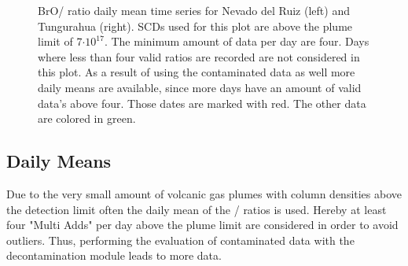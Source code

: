 \documentclass  [
  paper    = a4,
  BCOR     = 10mm,
  twoside,
  fontsize = 12pt,
  fleqn,
  toc      = bibnumbered,
  toc      = listofnumbered,
  numbers  = noendperiod,
  headings = normal,
  listof   = leveldown,
  version  = 3.03
]                                       {scrreprt}
\begin{document}
	\begin{figure}
		\caption[BrO/ ratio daily mean time series for Nevado del Ruiz (left) and Tungurahua (right).]{
			BrO/ ratio daily mean time series for Nevado del Ruiz (left) and Tungurahua (right).  SCDs used for this plot are above the plume limit of 7$\cdot 10^{17}$. The minimum amount of data per day are four. Days where less than four valid ratios are recorded are not considered in this plot. As a result of using the contaminated data as well more daily means are available, since more days have an amount of valid data's above four. Those dates are marked with red. The other data are colored in green.}
		\label{fig:dailymeanstungurahua}
	\end{figure}
	\subsection*{Daily Means}
	
	 Due to the very small amount of volcanic gas plumes with 
	  column densities above the detection limit often the daily mean of the /  ratios is used. Hereby at least four "Multi Adds" per day above the plume limit are considered in order to avoid outliers. Thus, performing the evaluation of contaminated data with the decontamination module leads to more data.\\
\end{document}
